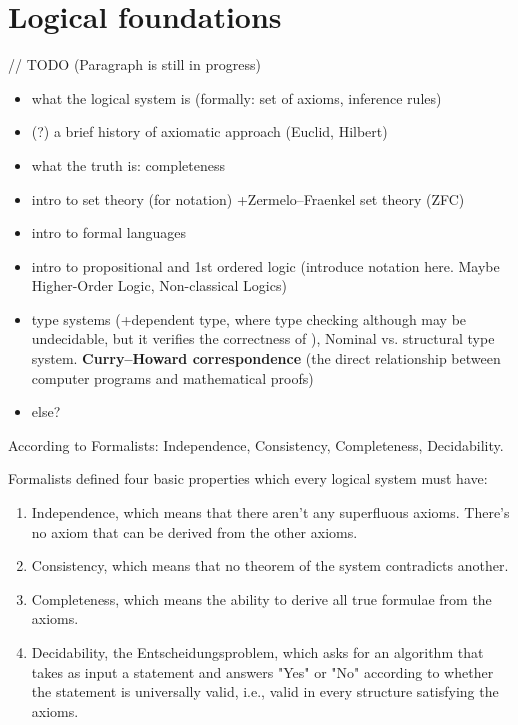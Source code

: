 \documentclass[article]{aaltoseries}
\begin{document}
\section{Logical foundations}
\label{sec:formal_theory}

// TODO (Paragraph is still in progress)

\begin{itemize}
\itemsep0em
	\item what the logical system is (formally: set of axioms, inference rules)
	\item (?) a brief history of axiomatic approach (Euclid, Hilbert)
	\item what the truth is: completeness
	\item intro to set theory (for notation) +Zermelo–Fraenkel set theory (ZFC)
	\item intro to formal languages
	\item intro to propositional and 1st ordered logic (introduce notation here. Maybe Higher-Order Logic, Non-classical Logics)
	\item type systems (+dependent type, where type checking although may be undecidable, but it verifies the correctness of ), Nominal vs. structural type system. \textbf{Curry–Howard correspondence} (the direct relationship between computer programs and mathematical proofs)
	\item else?
\end{itemize}

According to Formalists: Independence, Consistency, Completeness, Decidability.

Formalists defined four basic properties which every logical system must have:
\begin{enumerate}
\itemsep0em
	\item Independence, which means that there aren’t any superfluous axioms. There’s no axiom that can be derived from the other axioms.
	\item Consistency, which means that no theorem of the system contradicts another.
	\item Completeness, which means the ability to derive all true formulae from the axioms.
	\item Decidability, the Entscheidungsproblem, which asks for an algorithm that takes as input a statement and answers "Yes" or "No" according to whether the statement is universally valid, i.e., valid in every structure satisfying the axioms.
\end{enumerate}
\end{document}
